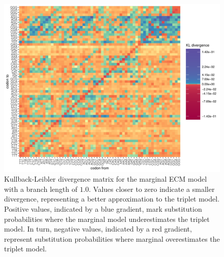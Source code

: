 
\begin{figure}[!ht]
    \centering
    \includegraphics[width = \textwidth]{chapter3/figures/heatmaps/tri-sum-ecm-1.pdf}
    \caption[Marginal-ecm Kullback-Leibler Divergence Matrix]{Kullback-Leibler divergence matrix for the marginal ECM model with a branch length of $1.0$. Values closer to zero indicate a smaller divergence, representing a better approximation to the triplet model. Positive values, indicated by a blue gradient, mark substitution probabilities where the marginal model underestimates the triplet model. In turn, negative values, indicated by a red gradient, represent substitution probabilities where marginal overestimates the triplet model.}
    \label{fig:kld-sum-ecm}
\end{figure}

